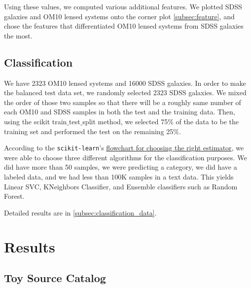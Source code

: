 \documentclass[\docopts]{\docclass}
\begin{document}
Using these values, we computed various additional features. We plotted
SDSS galaxies and OM10 lensed systems onto the corner plot
\autoref{subsec:feature}, and chose the features that differentiated
OM10 lensed systems from SDSS galaxies the most.

\subsection{Classification}
\label{subsec:classification}

We have 2323 OM10 lensed systems and 16000 SDSS galaxies. In order to
make the balanced test data set, we randomly selected 2323 SDSS
galaxies. We mixed the order of those two samples so that there will be
a roughly same number of each OM10 and SDSS samples in both the test and
the training data. Then, using the scikit train$\_$test$\_$split method,
we selected 75$\%$ of the data to be the training set and performed the
test on the remaining 25$\%$.

According to the \texttt{scikit-learn}'s
\href{http://scikit-learn.org/stable/tutorial/machine_learning_map/index.html}
{flowchart for choosing the right estimator}, we were able to choose
three different algorithms for the classification purposes. We did have
more than 50 samples, we were predicting a category, we did have a
labeled data, and we had less than 100K samples in a text data. This
yields Linear SVC, KNeighbors Classifier, and Ensemble classifiers such
as Random Forest.

Detailed results are in \autoref{subsec:classification_data}.


\section{Results}
\label{sec:results}

\subsection{Toy Source Catalog}
\label{subsec:toysource}
\end{document}
